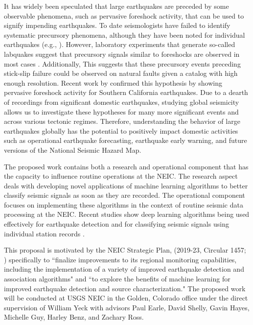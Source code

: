 \documentclass[12p]{article}
\begin{document}
It has widely been speculated that large earthquakes are preceded by some observable phenomena, such as pervasive
foreshock activity, that can be used to signify impending earthquakes. To date seismologists have failed to identify
systematic precursory phenomena, although they have been noted for individual earthquakes (e.g., \cite{Kanamori1981,
Shearer2009, Kato2012, Bouchon2013, Brodsky2014, Panet2018}). However, laboratory experiments that generate so-called
labquakes suggest that precursory signals similar to foreshocks are observed in most cases \citep{Goebel2013,
RouetLeduc2017, Bolton2019}. Additionally,  This suggests that these precursory events preceding stick-slip failure
could be observed on natural faults given a catalog with high enough resolution. Recent work by \citet{Trugman2019}
confirmed this hypothesis by showing pervasive foreshock activity for Southern California earthquakes. Due to a dearth
of recordings from significant domestic earthquakes, studying global seismicity allows us to investigate these
hypotheses for many more significant events and across various tectonic regimes. Therefore, understanding the behavior
of large earthquakes globally has the potential to positively impact domestic activities such as operational earthquake
forecasting, earthquake early warning, and future versions of the National Seismic Hazard Map.

The proposed work contains both a research and operational component that has the capacity to influence routine
operations at the NEIC. The research aspect deals with developing novel applications of machine learning algorithms to
better classify seismic signals as soon as they are recorded. The operational component focuses on implementing these
algorithms in the context of routine seismic data processing at the NEIC. Recent studies show deep learning algorithms
being used effectively for earthquake detection and for classifying seismic signals using individual station records
\citep{Perol2018, Ross2018a, Ross2018b, Zhu2019a, Zhu2019b, Mousavi2019}.

This proposal is motivated by the NEIC Strategic Plan, (2019-23, Circular 1457; \cite{Hayes2019sp}) specifically to
``finalize improvements to its regional monitoring capabilities, including the implementation of a variety of improved
earthquake detection and association algorithms" and ``to explore the benefits of machine learning for improved
earthquake detection and source characterization." The proposed work will be conducted at USGS NEIC in the Golden,
Colorado office under the direct supervision of William Yeck with advisors Paul Earle, David Shelly, Gavin Hayes,
Michelle Guy, Harley Benz, and Zachary Ross.
\end{document}
